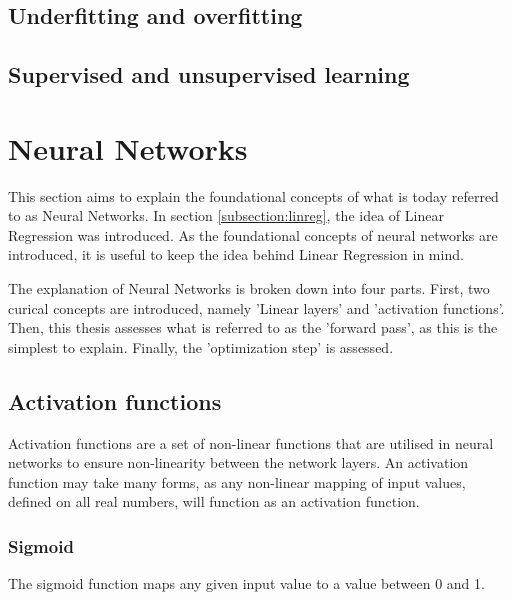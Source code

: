 \subsection{Underfitting and overfitting}

\subsection{Supervised and unsupervised learning}




\section{Neural Networks}




This section aims to explain the foundational concepts of what is today referred to as Neural Networks.
In section \ref{subsection:linreg}, the idea of Linear Regression was introduced.
As the foundational concepts of neural networks are introduced, it is useful to keep the idea behind Linear Regression in mind.

The explanation of Neural Networks is broken down into four parts. 
First, two curical concepts are introduced, namely 'Linear layers' and 'activation functions'. 
Then, this thesis assesses what is referred to as the 'forward pass', as this is the simplest to explain.
Finally, the 'optimization step' is assessed.




\subsection{Activation functions}
\label{subsection:activationFunctions}


Activation functions are a set of non-linear functions that are utilised in neural networks to ensure non-linearity between the network layers.
An activation function may take many forms, as any non-linear mapping of input values, defined on all real numbers, will function as an activation function.



\subsubsection{Sigmoid}

The sigmoid function maps any given input value to a value between 0 and 1. 




